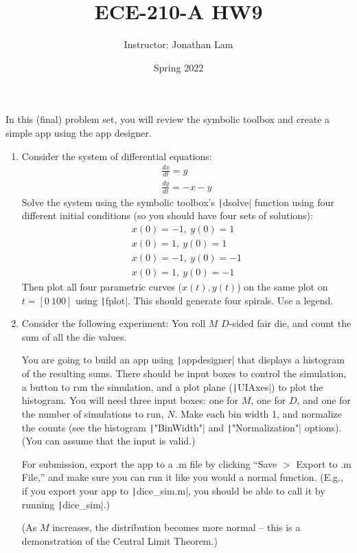 \documentclass{article}
\title{ECE-210-A HW9}
\author{Instructor: Jonathan Lam}
\date{Spring 2022}
\begin{document}
\maketitle

\noindent In this (final) problem set, you will review the symbolic toolbox and create a simple app using the app designer.

\begin{enumerate}
\item Consider the system of differential equations:
  \begin{gather*}
    \frac{dx}{dt}=y\\
    \frac{dy}{dt}=-x-y
  \end{gather*}
  Solve the system using the symbolic toolbox's \texttt|dsolve| function using four different initial conditions (so you should have four sets of solutions):
  \begin{gather*}
    x(0)=-1,\ y(0)=1\\
    x(0)=1,\ y(0)=1\\
    x(0)=-1,\ y(0)=-1\\
    x(0)=1,\ y(0)=-1
  \end{gather*}
  Then plot all four parametric curves ($x(t),y(t)$) on the same plot on $t=[0\ 100]$ using \texttt|fplot|. This should generate four spirals. Use a legend.
  
\item Consider the following experiment: You roll $M$ $D$-sided fair die, and count the sum of all the die values.
  
  You are going to build an app using \texttt|appdesigner| that displays a histogram of the resulting sums. There should be input boxes to control the simulation, a button to run the simulation, and a plot plane (\texttt|UIAxes|) to plot the histogram. You will need three input boxes: one for $M$, one for $D$, and one for the number of simulations to run, $N$. Make each bin width 1, and normalize the counts (see the histogram \texttt|"BinWidth"| and \texttt|"Normalization"| options). (You can assume that the input is valid.)
  
  For submission, export the app to a .m file by clicking ``Save $>$ Export to .m File,'' and make sure you can run it like you would a normal function. (E.g., if you export your app to \texttt|dice_sim.m|, you should be able to call it by running \texttt|dice_sim|.)
  
  (As $M$ increases, the distribution becomes more normal -- this is a demonstration of the Central Limit Theorem.)
\end{enumerate}
\end{document}
